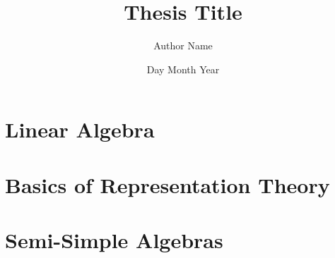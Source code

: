 \documentclass[11pt]{report}
\title{Thesis Title}
\author{Author Name}
\date{Day Month Year}
\begin{document}








\doublespacing
\doublespacing
  \tableofcontents

% 
\doublespacing
\chapter{Linear Algebra}


\chapter{Basics of Representation Theory}


\chapter{Semi-Simple Algebras}


%  

% 

% 
\singlespacing
\end{document}
